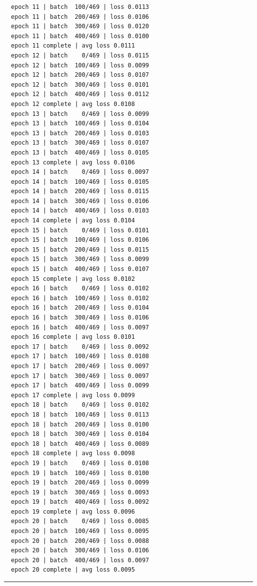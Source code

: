\documentclass[
  letterpaper,
  DIV=11,
  numbers=noendperiod]{scrartcl}
\begin{document}
\begin{verbatim}
  epoch 11 | batch  100/469 | loss 0.0113
  epoch 11 | batch  200/469 | loss 0.0106
  epoch 11 | batch  300/469 | loss 0.0120
  epoch 11 | batch  400/469 | loss 0.0100
  epoch 11 complete | avg loss 0.0111
  epoch 12 | batch    0/469 | loss 0.0115
  epoch 12 | batch  100/469 | loss 0.0099
  epoch 12 | batch  200/469 | loss 0.0107
  epoch 12 | batch  300/469 | loss 0.0101
  epoch 12 | batch  400/469 | loss 0.0112
  epoch 12 complete | avg loss 0.0108
  epoch 13 | batch    0/469 | loss 0.0099
  epoch 13 | batch  100/469 | loss 0.0104
  epoch 13 | batch  200/469 | loss 0.0103
  epoch 13 | batch  300/469 | loss 0.0107
  epoch 13 | batch  400/469 | loss 0.0105
  epoch 13 complete | avg loss 0.0106
  epoch 14 | batch    0/469 | loss 0.0097
  epoch 14 | batch  100/469 | loss 0.0105
  epoch 14 | batch  200/469 | loss 0.0115
  epoch 14 | batch  300/469 | loss 0.0106
  epoch 14 | batch  400/469 | loss 0.0103
  epoch 14 complete | avg loss 0.0104
  epoch 15 | batch    0/469 | loss 0.0101
  epoch 15 | batch  100/469 | loss 0.0106
  epoch 15 | batch  200/469 | loss 0.0115
  epoch 15 | batch  300/469 | loss 0.0099
  epoch 15 | batch  400/469 | loss 0.0107
  epoch 15 complete | avg loss 0.0102
  epoch 16 | batch    0/469 | loss 0.0102
  epoch 16 | batch  100/469 | loss 0.0102
  epoch 16 | batch  200/469 | loss 0.0104
  epoch 16 | batch  300/469 | loss 0.0106
  epoch 16 | batch  400/469 | loss 0.0097
  epoch 16 complete | avg loss 0.0101
  epoch 17 | batch    0/469 | loss 0.0092
  epoch 17 | batch  100/469 | loss 0.0108
  epoch 17 | batch  200/469 | loss 0.0097
  epoch 17 | batch  300/469 | loss 0.0097
  epoch 17 | batch  400/469 | loss 0.0099
  epoch 17 complete | avg loss 0.0099
  epoch 18 | batch    0/469 | loss 0.0102
  epoch 18 | batch  100/469 | loss 0.0113
  epoch 18 | batch  200/469 | loss 0.0100
  epoch 18 | batch  300/469 | loss 0.0104
  epoch 18 | batch  400/469 | loss 0.0089
  epoch 18 complete | avg loss 0.0098
  epoch 19 | batch    0/469 | loss 0.0108
  epoch 19 | batch  100/469 | loss 0.0100
  epoch 19 | batch  200/469 | loss 0.0099
  epoch 19 | batch  300/469 | loss 0.0093
  epoch 19 | batch  400/469 | loss 0.0092
  epoch 19 complete | avg loss 0.0096
  epoch 20 | batch    0/469 | loss 0.0085
  epoch 20 | batch  100/469 | loss 0.0095
  epoch 20 | batch  200/469 | loss 0.0088
  epoch 20 | batch  300/469 | loss 0.0106
  epoch 20 | batch  400/469 | loss 0.0097
  epoch 20 complete | avg loss 0.0095
\end{verbatim}

\begin{center}\rule{0.5\linewidth}{0.5pt}\end{center}
\end{document}
